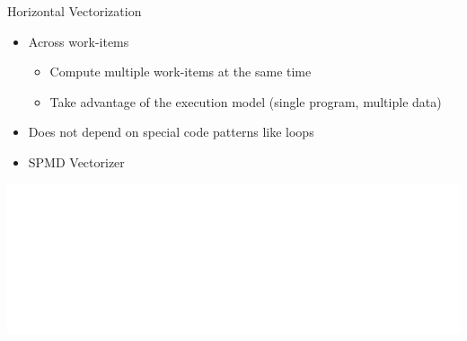 
\begin{frame}{Horizontal Vectorization}

\begin{itemize}
    \item Across work-items
    \begin{itemize}
        \item Compute multiple work-items at the same time
        \item Take advantage of the execution model (single program, multiple data)
    \end{itemize}
    \item Does not depend on special code patterns like loops
    \item SPMD Vectorizer
\end{itemize}

\vspace{2ex}
\hspace{1em}\includegraphics[scale=0.8]{images/horizontal-vectorization.pdf}

\end{frame}


